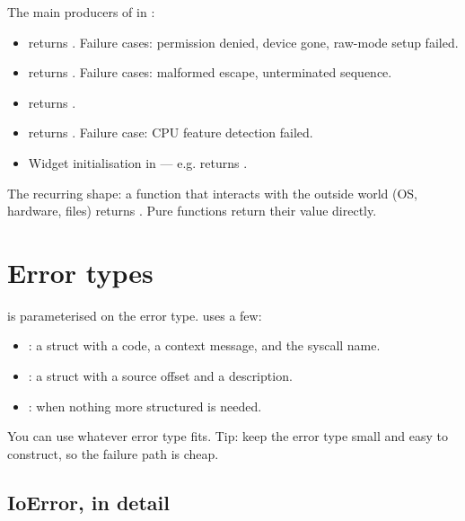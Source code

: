 The main producers of  in \maya{}:

\begin{itemize}[leftmargin=*]
  \item {} returns
    . Failure cases:
    permission denied, device gone, raw-mode setup failed.
  \item {} returns
    . Failure cases:
    malformed escape, unterminated sequence.
  \item {} returns
    .
  \item {} returns
    . Failure case: CPU
    feature detection failed.
  \item Widget initialisation in 
    --- e.g.  returns
    .
\end{itemize}

The recurring shape: a function that interacts with the outside
world (OS, hardware, files) returns . Pure
functions return their value directly.

\section{Error types}

 is parameterised on the error type. \maya{} uses
a few:

\begin{itemize}[leftmargin=*]
  \item {}: a struct with a  code, a
     context message, and the syscall name.
  \item {}: a struct with a source offset and a
    description.
  \item {}: when nothing more structured is
    needed.
\end{itemize}

You can use whatever error type fits. Tip: keep the error type
small and easy to construct, so the failure path is cheap.

\subsection*{IoError, in detail}

